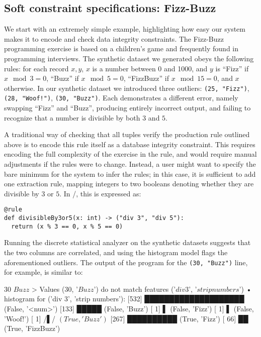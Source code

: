 \subsection{Soft constraint specifications: Fizz-Buzz}
We start with an extremely simple example, highlighting how easy our system makes it to encode and check data integrity constraints. The Fizz-Buzz programming exercise is based on a children's game and frequently found in programming interviews. The synthetic dataset we generated obeys the following rules: for each record \(x, y\), $x$ is a number between 0 and 1000, and $y$ is ``Fizz'' if \(x \mod 3 = 0\), ``Buzz'' if \(x \mod 5 = 0\), ``FizzBuzz'' if \(x \mod 15 = 0\), and \(x\) otherwise. In our synthetic dataset we introduced three outliers: \texttt{(25, "Fizz")}, \texttt{(28, "Woof!")}, \texttt{(30, "Buzz")}. Each demonstrates a different error, namely swapping ``Fizz'' and ``Buzz'', producing entirely incorrect output, and failing to recognize that a number is divisible by both $3$ and $5$.

A traditional way of checking that all tuples verify the production rule outlined above is to encode this rule itself as a database integrity constraint. This requires encoding the full complexity of the exercise in the rule, and would require manual adjustments if the rules were to change. Instead, a user might want to specify the bare minimum for the system to infer the rules; in this case, it is sufficient to add one extraction rule, mapping integers to two booleans denoting whether they are divisible by $3$ or $5$. In \dBoost/, this is expressed as:

\begin{verbatim}
@rule
def divisibleBy3or5(x: int) -> ("div 3", "div 5"):
  return (x % 3 == 0, x % 5 == 0)
\end{verbatim}

Running the discrete statistical analyzer on the synthetic datasets suggests that the two columns are correlated, and using the histogram model flags the aforementioned outliers. The output of the program for the \texttt{(30, "Buzz")} line, for example, is similar to:

\begin{lstnobreak}[gobble=2]
   $30$ $Buzz$
   > Values ($30$, '$Buzz$') do not
     match features ('$div 3$', '$strip numbers$')
   • histogram for ('div 3', 'strip numbers'):
     [532] ████████████████████ (False, '<num>')
     [133] █████ (False, 'Buzz')
     [  1] ▌ (False, 'Fizz')
     [  1] ▌ (False, 'Woof!')
     [  1] /▌/ $(True, 'Buzz')$
     [267] ██████████ (True, 'Fizz')
     [ 66] ██ (True, 'FizzBuzz')
\end{lstnobreak}

